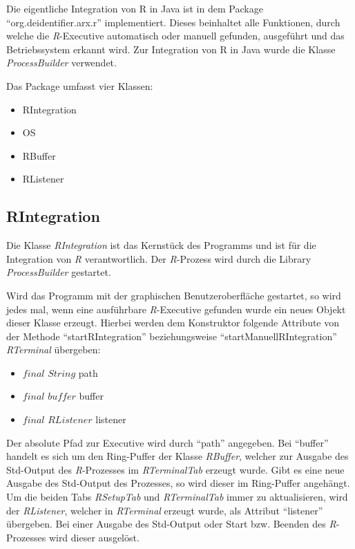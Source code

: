 \documentclass[a4paper, 12pt]{report} %
\begin{document}
Die eigentliche Integration von R in Java ist in dem Package "`org.deidentifier.arx.r"' implementiert. Dieses beinhaltet alle Funktionen, durch welche die \textit{R}-Executive automatisch oder manuell gefunden, ausgeführt und das Betriebssystem erkannt wird. Zur Integration von R in Java wurde die Klasse \textit{ProcessBuilder} verwendet.

\begin{samepage}
Das Package umfasst vier Klassen:
\begin{itemize}
	\item RIntegration
	\item OS
	\item RBuffer
	\item RListener
\end{itemize}
\end{samepage}


\subsection{RIntegration} \label{RIntegration}

Die Klasse \textit{RIntegration} ist das Kernstück des Programms und ist für die Integration von \textit{R} verantwortlich. Der \textit{R}-Prozess wird durch die Library \textit{ProcessBuilder} gestartet.

Wird das Programm mit der graphischen Benutzeroberfläche gestartet, so wird jedes mal, wenn eine ausführbare \textit{R}-Executive gefunden wurde ein neues Objekt dieser Klasse erzeugt.
Hierbei werden dem Konstruktor folgende Attribute von der Methode "`startRIntegration"' beziehungsweise "`startManuellRIntegration"' \textit{RTerminal} übergeben:
\begin{itemize}
	\item $final$ $String$ path
	\item $final$ $buffer$ buffer 
	\item $final$ $RListener$ listener
\end{itemize}
%
Der absolute Pfad zur Executive wird durch "`path"' angegeben. Bei "`buffer"' handelt es sich um den Ring-Puffer der Klasse \textit{RBuffer}, welcher zur Ausgabe des Std-Output des \textit{R}-Prozesses im \textit{RTerminalTab} erzeugt wurde. Gibt es eine neue Ausgabe des Std-Output des Prozesses, so wird dieser im Ring-Puffer angehängt. 
Um die beiden Tabs \textit{RSetupTab} und \textit{RTerminalTab} immer zu aktualisieren, wird der \textit{RListener}, welcher in \textit{RTerminal} erzeugt wurde, als Attribut "`listener"' übergeben.
Bei einer Ausgabe des Std-Output oder Start bzw. Beenden des \textit{R}-Prozesses wird dieser ausgelöst.\\
\end{document}
